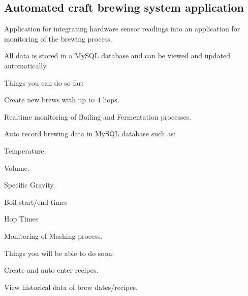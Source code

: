 \subsection*{Automated craft brewing system application}

Application for integrating hardware sensor readings into an application for monitoring of the brewing process.

All data is stored in a My\+S\+QL database and can be viewed and updated automatically

Things you can do so far\+:
\begin{DoxyItemize}
\item Create new brews with up to 4 hops.
\item Realtime monitoring of Boiling and Fermentation processes.
\item Auto record brewing data in My\+S\+QL database such as\+:
\begin{DoxyItemize}
\item Temperature.
\item Volume.
\item Specific Gravity.
\item Boil start/end times
\item Hop Times
\end{DoxyItemize}
\item Monitoring of Mashing process.
\end{DoxyItemize}

Things you will be able to do soon\+:
\begin{DoxyItemize}
\item Create and auto enter recipes.
\item View historical data of brew dates/recipes. 
\end{DoxyItemize}